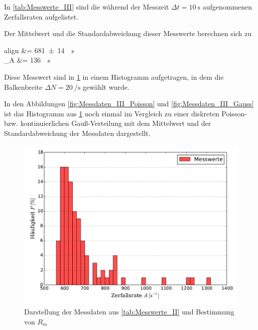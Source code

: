	In \cref{tab:Messwerte_III} sind die  während der Messzeit 
	$\Delta t = \SI{10}{\second}$ aufgenommenen Zerfallsraten aufgelistet.

	Der Mittelwert und die Standardabweichung dieser Messwerte berechnen sich zu
	\begin{empheq}{align}
		 &= \SI{681(14)}{\per\second}\\
		\sigma_{A} &= \SI{136}{\per\second}\\
	\end{empheq}
	
	Diese Messwert sind in \cref{fig:Messdaten_III} in einem Histogramm aufgetragen,
	in dem die Balkenbreite $\Delta N = \SI{20}{\per\second}$ gewählt wurde.
	
	In den Abbildungen \ref{fig:Messdaten_III_Poisson} und \ref{fig:Messdaten_III_Gauss}
	ist das Histogramm aus \cref{fig:Messdaten_III} noch einmal im Vergleich zu einer 
	diskreten Poisson- bzw. kontinuierlichen Gauß-Verteilung mit dem Mittelwert und der 
	Standardabweichung der Messdaten dargestellt.
\newpage
	
\newpage


	
	\begin{figure}[!h]
		\centering
		\includegraphics[scale=0.7]{Grafiken/AktivitaetHistogramm.pdf}
		\caption{Darstellung der Messdaten aus \cref{tab:Messwerte_II} und Bestimmung von $R_{m}$}
		\label{fig:Messdaten_III}
	\end{figure}
		

